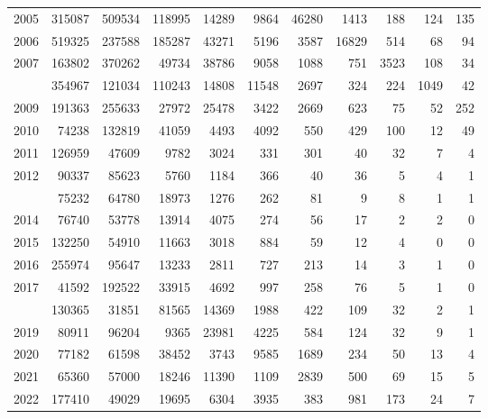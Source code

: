 \documentclass[
]{article}
\begin{document}
\begin{longtable}[t]{lrrrrrrrrrr}
2005 & 315087 & 509534 & 118995 & 14289 & 9864 & 46280 & 1413 & 188 & 124 & 135\\
2006 & 519325 & 237588 & 185287 & 43271 & 5196 & 3587 & 16829 & 514 & 68 & 94\\
2007 & 163802 & 370262 & 49734 & 38786 & 9058 & 1088 & 751 & 3523 & 108 & 34\\
\addlinespace
2008 & 354967 & 121034 & 110243 & 14808 & 11548 & 2697 & 324 & 224 & 1049 & 42\\
2009 & 191363 & 255633 & 27972 & 25478 & 3422 & 2669 & 623 & 75 & 52 & 252\\
2010 & 74238 & 132819 & 41059 & 4493 & 4092 & 550 & 429 & 100 & 12 & 49\\
2011 & 126959 & 47609 & 9782 & 3024 & 331 & 301 & 40 & 32 & 7 & 4\\
2012 & 90337 & 85623 & 5760 & 1184 & 366 & 40 & 36 & 5 & 4 & 1\\
\addlinespace
2013 & 75232 & 64780 & 18973 & 1276 & 262 & 81 & 9 & 8 & 1 & 1\\
2014 & 76740 & 53778 & 13914 & 4075 & 274 & 56 & 17 & 2 & 2 & 0\\
2015 & 132250 & 54910 & 11663 & 3018 & 884 & 59 & 12 & 4 & 0 & 0\\
2016 & 255974 & 95647 & 13233 & 2811 & 727 & 213 & 14 & 3 & 1 & 0\\
2017 & 41592 & 192522 & 33915 & 4692 & 997 & 258 & 76 & 5 & 1 & 0\\
\addlinespace
2018 & 130365 & 31851 & 81565 & 14369 & 1988 & 422 & 109 & 32 & 2 & 1\\
2019 & 80911 & 96204 & 9365 & 23981 & 4225 & 584 & 124 & 32 & 9 & 1\\
2020 & 77182 & 61598 & 38452 & 3743 & 9585 & 1689 & 234 & 50 & 13 & 4\\
2021 & 65360 & 57000 & 18246 & 11390 & 1109 & 2839 & 500 & 69 & 15 & 5\\
2022 & 177410 & 49029 & 19695 & 6304 & 3935 & 383 & 981 & 173 & 24 & 7\\*
\end{longtable}
\end{document}
